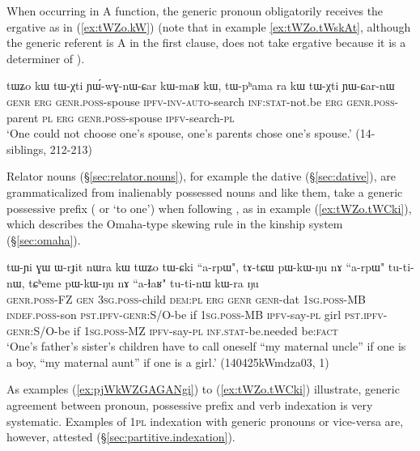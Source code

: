 When occurring in A function, the generic pronoun  obligatorily receives the ergative  as in (\ref{ex:tWZo.kW}) (note that in example \ref{ex:tWZo.tWskAt}, although the generic referent is A in the first clause,  does not take ergative because it is a determiner of ). 

\begin{exe}
\ex \label{ex:tWZo.kW}
\gll tɯʑo kɯ tɯ-χti ɲɯ́-wɣ-nɯ-ɕar kɯ-maʁ kɯ,  tɯ-pʰama ra kɯ tɯ-χti ɲɯ-ɕar-nɯ \\
\textsc{genr} \textsc{erg} \textsc{genr}.\textsc{poss}-spouse \textsc{ipfv}-\textsc{inv}-\textsc{auto}-search \textsc{inf}:\textsc{stat}-not.be \textsc{erg} \textsc{genr}.\textsc{poss}-parent \textsc{pl} \textsc{erg} \textsc{genr}.\textsc{poss}-spouse \textsc{ipfv}-search-\textsc{pl}  \\
\glt `One could not choose one's spouse, one's parents chose one's spouse.' (14-siblings, 212-213)
\end{exe} 

Relator nouns (§\ref{sec:relator.nouns}), for example the dative  (§\ref{sec:dative}),  are grammaticalized from inalienably possessed nouns and like them, take a generic possessive prefix ( or  `to one') when following , as in example (\ref{ex:tWZo.tWCki}), which describes the Omaha-type skewing rule in the kinship system (§\ref{sec:omaha}).

\begin{exe}
\ex \label{ex:tWZo.tWCki}
\gll
tɯ-ɲi ɣɯ ɯ-rɟit nɯra kɯ tɯʑo tɯ-ɕki ``a-rpɯ", tɤ-tɕɯ pɯ-kɯ-ŋu nɤ ``a-rpɯ" tu-ti-nɯ, tɕʰeme pɯ-kɯ-ŋu nɤ ``a-ɬaʁ" tu-ti-nɯ kɯ-ra ŋu \\
\textsc{genr}.\textsc{poss}-FZ \textsc{gen} \textsc{3sg}.\textsc{poss}-child \textsc{dem}:\textsc{pl} \textsc{erg} \textsc{genr} \textsc{genr}-dat \textsc{1sg}.\textsc{poss}-MB \textsc{indef}.\textsc{poss}-son \textsc{pst}.\textsc{ipfv}-\textsc{genr}:S/O-be if \textsc{1sg}.\textsc{poss}-MB \textsc{ipfv}-say-\textsc{pl} girl \textsc{pst}.\textsc{ipfv}-\textsc{genr}:S/O-be  if \textsc{1sg}.\textsc{poss}-MZ \textsc{ipfv}-say-\textsc{pl} \textsc{inf}.\textsc{stat}-be.needed be:\textsc{fact} \\
\glt `One's father's sister's children have to call oneself ``my maternal uncle'' if one is a boy, ``my maternal aunt'' if one is a girl.'  (140425kWmdza03, 1)
\end{exe} 

As examples (\ref{ex:pjWkWZGAGANgi}) to (\ref{ex:tWZo.tWCki}) illustrate, generic agreement between pronoun, possessive prefix and verb indexation is very systematic. Examples of \textsc{1pl} indexation with generic pronouns or vice-versa are, however, attested (§\ref{sec:partitive.indexation}).

